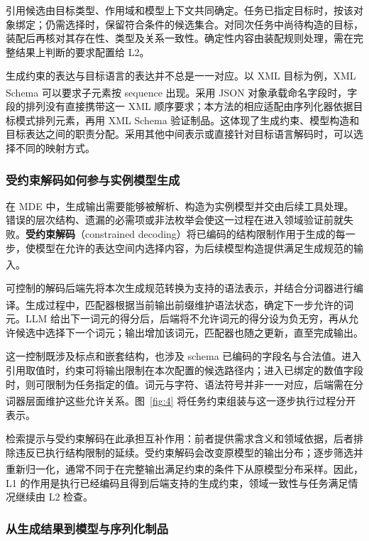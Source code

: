 \documentclass[pdflatex,iicol,sn-mathphys-num]{sn-jnl}
\newcommand{\paperref}[1]{\textsuperscript{\textcolor{citationred}{\citep{#1}}}}
\begin{document}
引用候选由目标类型、作用域和模型上下文共同确定。任务已指定目标时，按该对象绑定；仍需选择时，保留符合条件的候选集合。对同次任务中尚待构造的目标，装配后再核对其存在性、类型及关系一致性。确定性内容由装配规则处理，需在完整结果上判断的要求配置给 L2。


生成约束的表达与目标语言的表达并不总是一一对应。以 XML 目标为例，XML Schema 可以要求子元素按 sequence 出现\paperref{W3C2004XMLSchemaStructures}。采用 JSON 对象承载命名字段时，字段的排列没有直接携带这一 XML 顺序要求；本方法的相应适配由序列化器依据目标模式排列元素，再用 XML Schema 验证制品。这体现了生成约束、模型构造和目标表达之间的职责分配。采用其他中间表示或直接针对目标语言解码时，可以选择不同的映射方式。


\subsubsection{受约束解码如何参与实例模型生成}\label{sec:method-3-5-2}

在 MDE 中，生成输出需要能够被解析、构造为实例模型并交由后续工具处理。错误的层次结构、遗漏的必需项或非法枚举会使这一过程在进入领域验证前就失败。\textbf{受约束解码}（constrained decoding）将已编码的结构限制作用于生成的每一步，使模型在允许的表达空间内选择内容，为后续模型构造提供满足生成规范的输入\paperref{geng-etal-2023-grammar}。


可控制的解码后端先将本次生成规范转换为支持的语法表示，并结合分词器进行编译\paperref{MLSYS2025_5c20ca4b}\paperref{Li_2026}。生成过程中，匹配器根据当前输出前缀维护语法状态，确定下一步允许的词元。LLM 给出下一词元的得分后，后端将不允许词元的得分设为负无穷，再从允许候选中选择下一个词元；输出增加该词元，匹配器也随之更新，直至完成输出。


这一控制既涉及标点和嵌套结构，也涉及 schema 已编码的字段名与合法值。进入引用取值时，约束可将输出限制在本次配置的候选路径内；进入已绑定的数值字段时，则可限制为任务指定的值。词元与字符、语法符号并非一一对应，后端需在分词器层面维护这些允许关系\paperref{MLSYS2025_5c20ca4b}。图~\ref{fig:4} 将任务约束组装与这一逐步执行过程分开表示。


检索提示与受约束解码在此承担互补作用：前者提供需求含义和领域依据，后者排除违反已执行结构限制的延续。受约束解码会改变原模型的输出分布；逐步筛选并重新归一化，通常不同于在完整输出满足约束的条件下从原模型分布采样\paperref{NEURIPS2024_2bdc2267}。因此，L1 的作用是执行已经编码且得到后端支持的生成约束，领域一致性与任务满足情况继续由 L2 检查。


\subsubsection{从生成结果到模型与序列化制品}\label{sec:method-3-5-3}
\end{document}
